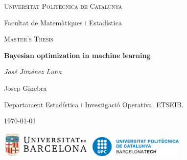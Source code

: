 \documentclass[10pt,a4paper,twoside]{book}
\begin{document}

\begin{titlepage}
	\centering
	{\scshape\LARGE Universitat Polit\`ecnica de Catalunya\par
	 Facultat de Matem\`atiques i Estad\'istica\par}
	\vspace{1cm}
	{\scshape\Large Master's Thesis\par}
	\vspace{1.5cm}
	{\huge\bfseries Bayesian optimization in machine learning\par}
	\vspace{2cm}
	{\Large\itshape José Jiménez Luna\par}

	\vfill
	{\color{olive}{supervised by}}\par
	Josep Ginebra\par
	Departament Estadística i Investigació Operativa. ETSEIB.

	\vfill

	    {\large \today\par}
	    \vfill
		\includegraphics[width=0.35\textwidth]{figures/ublogo}\hspace{1cm}						\includegraphics[width=0.35\textwidth]{figures/upclogo}\par\vspace{1cm}
\par\vspace{1cm}
\end{titlepage}
\end{document}
